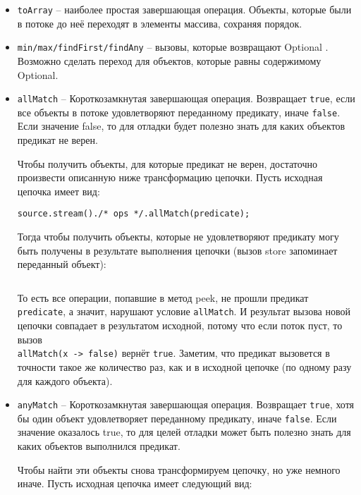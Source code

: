 \begin{itemize}
	\item \texttt{toArray} -- наиболее простая завершающая операция. Объекты, которые были в потоке до неё переходят в элементы массива, сохраняя порядок.
	\item \texttt{min/max/findFirst/findAny} -- вызовы, которые возвращают Optional \cite{java:optional}. Возможно сделать переход для объектов, которые равны содержимому Optional.
	\item \texttt{allMatch} -- Короткозамкнутая завершающая операция. Возвращает \texttt{true}, если все объекты в потоке удовлетворяют переданному предикату, иначе \texttt{false}. Если значение false, то для отладки будет полезно знать для каких объектов предикат не верен.
	
	Чтобы получить объекты, для которые предикат не верен, достаточно произвести описанную ниже трансформацию цепочки. Пусть исходная цепочка имеет вид:
	
	\texttt{source.stream()./* ops */.allMatch(predicate);}
	
	Тогда чтобы получить объекты, которые не удовлетворяют предикату могу быть получены в результате выполнения цепочки (вызов store запоминает переданный объект):
	
	\inputminted{java}{chapter2/code/allMatchTransform.java}
	
	То есть все операции, попавшие в метод peek, не прошли предикат \texttt{predicate}, а значит, нарушают условие \texttt{allMatch}. И результат вызова новой цепочки совпадает в результатом исходной, потому что если поток пуст, то вызов \\ \texttt{allMatch(x -> false)} вернёт \texttt{true}. Заметим, что предикат вызовется в точности такое же количество раз, как и в исходной цепочке (по одному разу для каждого объекта). 
	
	\item \texttt{anyMatch} -- Короткозамкнутая завершающая операция. Возвращает \texttt{true}, хотя бы один объект удовлетворяет переданному предикату, иначе \texttt{false}. Если значение оказалось true, то для целей отладки может быть полезно знать для каких объектов выполнился предикат.
	
	Чтобы найти эти объекты снова трансформируем цепочку, но уже немного иначе. Пусть исходная цепочка имеет следующий вид: 
	
	\inputminted{java}{chapter2/code/anyMatch.java}
	

\end{itemize}
